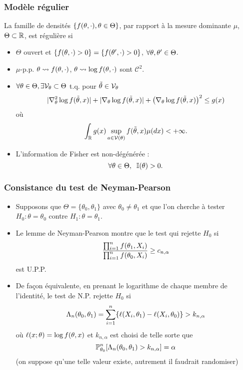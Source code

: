 \begin{frame}
\frametitle{Modèle régulier}
\begin{df} La famille de densités $\{f(\theta,\cdot),\theta \in \Theta\}$,  par rapport à la mesure dominante $\mu$, $\Theta \subset \operatorname{{\mathbb R}}$, est \alert{régulière} si
\begin{itemize}
\item $\Theta$ ouvert et $\{f(\theta, \cdot)>0\}=\{f(\theta', \cdot)>0\}$, $\forall \theta, \theta' \in \Theta$.
\item $\mu$-p.p. $\theta \leadsto f(\theta,\cdot)$, $\theta \leadsto \log f(\theta,\cdot)$ sont ${\mathcal C}^2$.
 \item $\forall \theta \in \Theta, \exists {\mathcal V}_\theta \subset \Theta$ t.q. pour $\tilde{\theta} \in {\mathcal V}_\theta$
$$|\nabla_\theta^{2}\log f(\tilde{\theta},x)|+|\nabla_\theta \log f(\tilde{\theta},x)|+\big(\nabla_\theta\log f(\tilde{\theta},x)\big)^2\leq g(x)$$
où
$$\int_{\mathbb{R}}g(x)\sup_{a \in {\mathcal V}(\theta)}f(\tilde{\theta},x)\mu(dx)<+\infty.$$
\item L'information de Fisher est non-dégénérée :
$$\forall \theta \in \Theta,\;\;\mathbb{I}(\theta) >0.$$
\end{itemize}
\end{df}
\end{frame}

\begin{frame}
\frametitle{Consistance du test de Neyman-Pearson}
\begin{itemize}
\item Supposons que $\Theta= \{\theta_0,\theta_1\}$ avec $\theta_0 \ne \theta_1$ et que l'on cherche à tester $H_0: \theta = \theta_0$ contre $H_1: \theta= \theta_1$.
\item Le lemme de Neyman-Pearson montre que le test qui rejette $H_0$ si 
\[
\frac{\prod_{i=1}^n f(\theta_1,X_i)}{\prod_{i=1}^{n} f(\theta_0,X_i)} \geq c_{n,\alpha}
\]
est U.P.P. 
\item De façon équivalente, en prenant le logarithme de chaque membre de l'identité, le test de N.P. rejette $H_0$ si 
\[
\Lambda_n(\theta_0,\theta_1) = \sum_{i=1}^n \{ \ell(X_i,\theta_1) - \ell(X_i,\theta_0) \} > k_{n,\alpha}
\]
où $\ell(x;\theta)= \log f(\theta,x)$ et $k_{n,\alpha}$ est choisi de telle sorte que 
\[
\operatorname{{\mathbb P}}_{\theta_0}^n [ \Lambda_n(\theta_0,\theta_1)  > k_{n,\alpha}] = \alpha 
\]
(on suppose qu'une telle valeur existe, autrement il faudrait randomiser)
\end{itemize}
\end{frame}

